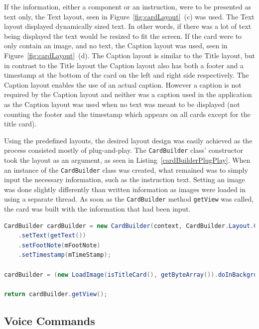 If the information, either a component or an instruction, were to be presented as text only, the Text layout, seen in Figure~\ref{fig:cardLayout}~(c) was used. The Text layout displayed dynamically sized text. In other words, if there was a lot of text being displayed the text would be resized to fit the screen.
\newpage
If the card were to only contain an image, and no text, the Caption layout was used, seen in Figure~\ref{fig:cardLayout}~(d). The Caption layout is similar to the Title layout, but in contrast to the Title layout the Caption layout also has both a footer and a timestamp at the bottom of the card on the left and right side respectively. The Caption layout enables the use of an actual caption. However a caption is not required by the Caption layout and neither was a caption used in the application as the Caption layout was used when no text was meant to be displayed (not counting the footer and the timestamp which appears on all cards except for the title card).

Using the predefined layouts, the desired layout design was easily achieved as the process consisted mostly of plug-and-play. The \texttt{CardBuilder} class' constructor took the layout as an argument, as seen in Listing~\ref{cardBuilderPlugPlay}. When an instance of the \texttt{CardBuilder} class was created, what remained was to simply input the necessary information, such as the instruction text. Setting an image was done slightly differently than written information as images were loaded in using a separate thread. As soon as the \texttt{CardBuilder} method \texttt{getView} was called, the card was built with the information that had been input.

\begin{lstlisting}[language=Java, caption={Initialisation of the CardBuilder class}, label=cardBuilderPlugPlay]
CardBuilder cardBuilder = new CardBuilder(context, CardBuilder.Layout.COLUMNS)
	.setText(getText())
	.setFootNote(mFootNote)
	.setTimestamp(mTimeStamp);

cardBuilder = (new LoadImage(isTitleCard(), getByteArray()).doInBackground(cardBuilder));

return cardBuilder.getView();
\end{lstlisting}


\subsection{Voice Commands}


